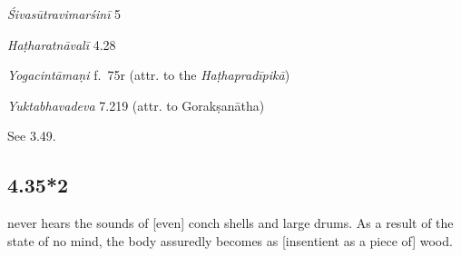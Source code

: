 \begin{ekdosis}
\begin{sources}[hp04_035_1]
\emph{Śivasūtravimarśinī} 5
\begin{versinnote}
\end{versinnote}
\end{sources}

\begin{testimonia}[hp04_035_1]
\emph{Haṭharatnāvalī} 4.28
\begin{versinnote}
\end{versinnote}

\emph{Yogacintāmaṇi} f.~75r (attr. to the \emph{Haṭhapradīpikā})
\begin{versinnote}
\end{versinnote}

\emph{Yuktabhavadeva} 7.219 (attr. to Gorakṣanātha)
\begin{versinnote}
\end{versinnote}

\end{testimonia}

\begin{philcomm}[hp04_035_1]
See 3.49.
\end{philcomm}

\subsection*{4.35*2}
\begin{translation} never hears the sounds of [even] conch shells and large drums. As a result of the state of no mind, the body assuredly becomes as [insentient as a piece of] wood.
\end{translation}
%


\end{ekdosis}
